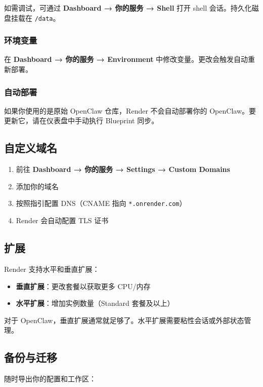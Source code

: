 如需调试，可通过 \textbf{Dashboard → 你的服务 → Shell} 打开 shell 会话。持久化磁盘挂载在 \texttt{/data}。

\subsubsection{环境变量}


在 \textbf{Dashboard → 你的服务 → Environment} 中修改变量。更改会触发自动重新部署。

\subsubsection{自动部署}


如果你使用的是原始 OpenClaw 仓库，Render 不会自动部署你的 OpenClaw。要更新它，请在仪表盘中手动执行 Blueprint 同步。

\subsection{自定义域名}


\begin{enumerate}
  \item 前往 \textbf{Dashboard → 你的服务 → Settings → Custom Domains}
  \item 添加你的域名
  \item 按照指引配置 DNS（CNAME 指向 \texttt{*.onrender.com}）
  \item Render 会自动配置 TLS 证书
\end{enumerate}


\subsection{扩展}


Render 支持水平和垂直扩展：

\begin{itemize}
  \item \textbf{垂直扩展}：更改套餐以获取更多 CPU/内存
  \item \textbf{水平扩展}：增加实例数量（Standard 套餐及以上）
\end{itemize}


对于 OpenClaw，垂直扩展通常就足够了。水平扩展需要粘性会话或外部状态管理。

\subsection{备份与迁移}


随时导出你的配置和工作区：

